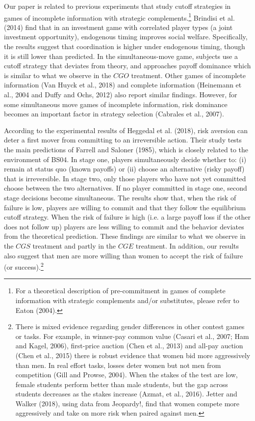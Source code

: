 \documentclass[12pt,english]{article}
\begin{document}
Our paper is related to previous experiments that study cutoff strategies in games of incomplete information with strategic complements.\footnote{For a theoretical description of pre-commitment in games of complete information with strategic complements and/or substitutes, please refer to Eaton (2004).} Brindisi et al. (2014) find that in an investment game with correlated player types (a joint investment opportunity), endogenous timing improves social welfare. Specifically, the results suggest that coordination is higher under endogenous timing, though it is still lower than predicted. In the simultaneous-move game, subjects use a cutoff strategy that deviates from theory, and approaches payoff dominance which is similar to what we observe in the $CGO$ treatment. Other games of incomplete information (Van Huyck et al., 2018) and complete information (Heinemann et al., 2004 and Duffy and Ochs, 2012) also report similar findings. However, for some simultaneous move games of incomplete information, risk dominance becomes an important factor in strategy selection (Cabrales et al., 2007).

According to the experimental results of Heggedal et al. (2018), risk aversion can deter a first mover from committing to an irreversible action. Their study tests the main predictions of Farrell and Saloner (1985), which is closely related to the environment of BS04. In stage one, players simultaneously decide whether to: (i) remain at status quo (known payoffs) or (ii) choose an alternative (risky payoff) that is irreversible. In stage two, only those players who have not yet committed choose between the two alternatives. If no player committed in stage one, second stage decisions become simultaneous. The results show that, when the risk of failure is low, players are willing to commit and that they follow the equilibrium cutoff strategy. When the risk of failure is high (i.e. a large payoff loss if the other does not follow up) players are less willing to commit and the behavior deviates from the theoretical prediction. These findings are similar to what we observe in the $CGS$ treatment and partly in the $CGE$ treatment. In addition, our results also suggest that men are more willing than women to accept the risk of failure (or success).\footnote{There is  mixed evidence regarding gender differences in other contest games or tasks. For example, in winner-pay common value (Casari et al., 2007; Ham and Kagel, 2006), first-price auction (Chen et al., 2013) and all-pay auction (Chen et al., 2015) there is robust evidence that women bid more aggressively than men. In real effort tasks, losses deter women but not men from competition (Gill and Prowse, 2004). When the stakes of the test are low, female students perform better than male students, but the gap across students decreases as the stakes increase (Azmat, et al., 2016). Jetter and Walker (2018), using data from Jeopardy!, find that women compete more aggressively and take on more risk when paired against men.} 
\end{document}
